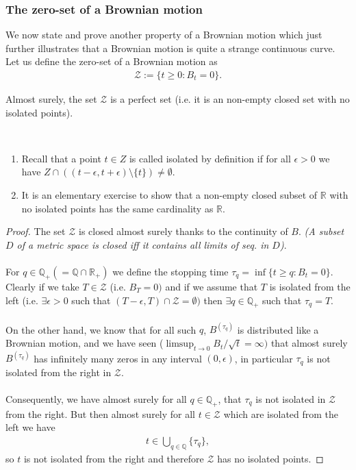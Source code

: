 \documentclass[../mainfile.tex]{subfiles}
\begin{document}
\subsubsection{The zero-set of a Brownian motion}
We now state and prove another property of a Brownian motion which just further illustrates that a Brownian motion is quite a strange continuous curve. Let us define the zero-set of a Brownian motion as 
\begin{align*}
\mathcal{Z}:= \{ t \geq 0 : B_t = 0 \}. 
\end{align*}
\begin{prop} Almost surely, the set $\mathcal{Z}$ is a perfect set (i.e. it is an non-empty closed set with no isolated points).
\end{prop}
\begin{rem} \
\begin{enumerate}
\item Recall that a point $t \in Z$ is called isolated by definition if for all $\epsilon >0$ we have $Z \cap ( (t- \epsilon, t+ \epsilon) \setminus \{t\}) \neq \emptyset$.
\item It is an elementary exercise to show that a non-empty closed subset of $\mathbb{R}$ with no isolated points has the same cardinality as $\mathbb{R}$. 
\end{enumerate} 
\end{rem}
\begin{proof}
The set $\mathcal{Z}$ is closed almost surely thanks to the continuity of $B$. \textit{(A subset $D$ of a metric space is closed iff it contains all limits of seq. in $D$)}. \\\\
For $q \in \mathbb{Q}_+(= \mathbb{Q} \cap \mathbb{R}_+)$ we define the stopping time $\tau_q = \inf \{ t \geq q : B_t=0 \}$. Clearly if we take $T \in \mathcal{Z}$ (i.e. $B_T=0)$ and if we assume that $T$ is isolated from the left (i.e. $\exists \epsilon >0$ such that $(T- \epsilon , T) \cap \mathcal{Z} = \emptyset)$ then $\exists q \in \mathbb{Q}_+$ such that $\tau_q=T$. \\
\\
On the other hand, we know that for all such $q$,  $B^{(\tau_q)}$ is distributed like a Brownian motion, and we have seen ($\limsup_{t \to 0} B_t/\sqrt{t}=\infty)$ that almost surely $B^{( \tau_q)}$ has infinitely many zeros in any interval $(0, \epsilon)$, in particular $\tau_q$ is not isolated from the right in $\mathcal{Z}$. \\
\\
Consequently,  we have almost surely for all $q \in \mathbb{Q}_+$, that $\tau_q$ is not isolated in $\mathcal{Z}$ from the right. But then almost surely for all $t \in \mathcal{Z}$ which are isolated from the left we have 
\begin{align*}
t \in \bigcup_{q  \in \mathbb{Q}} \{\tau_q\},
\end{align*}
so $t$ is not isolated from the right and therefore $\mathcal{Z}$ has no isolated points. 
\end{proof}
\end{document}
